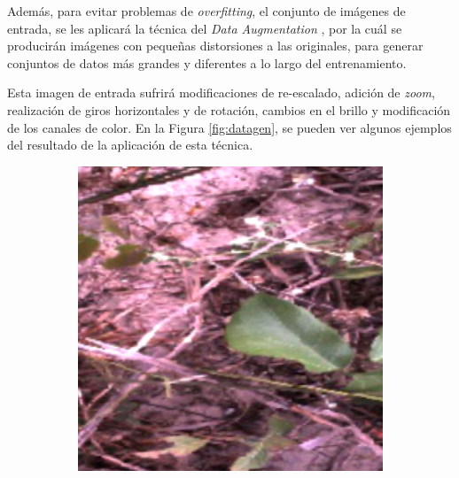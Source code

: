 Además, para evitar problemas de \textit{overfitting}, el conjunto de imágenes de entrada, se les aplicará la técnica del \textit{Data Augmentation} \cite{perez2017effectiveness}, por la cuál se producirán imágenes con pequeñas distorsiones a las originales, para generar conjuntos de datos más grandes y diferentes a lo largo del entrenamiento. 

Esta imagen de entrada sufrirá modificaciones de re-escalado, adición de \textit{zoom}, realización de giros horizontales y de rotación, cambios en el brillo y modificación de los canales de color. En la Figura \ref{fig:datagen}, se pueden ver algunos ejemplos del resultado de la aplicación de esta técnica.\\

\begin{figure}[h]
\centering
    \begin{subfigure}{0.3\textwidth}
        \includegraphics[width=\textwidth]{figuras/implementacion/dataset/imagenes_datagen_1.png}
        \caption{}
    \end{subfigure}
    \hfill
    \begin{subfigure}{0.3\textwidth}

\end{subfigure}
\end{figure}
